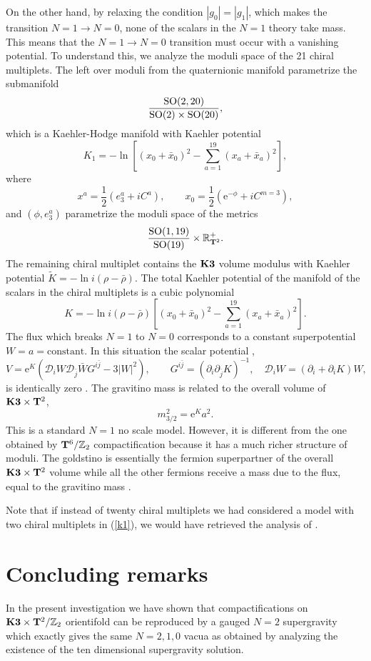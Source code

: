 \documentclass[a4paper,12pt]{article}
\begin{document}
On the other hand, by relaxing the condition $|g_0|=|g_1|$, which
makes the transition $N=1 \to N=0$, none of the scalars in the
$N=1$ theory take mass. This means that the $N=1 \to N=0$
transition must occur with a vanishing potential. To understand
this, we analyze the moduli space of the 21 chiral multiplets. The
left over moduli from the quaternionic manifold parametrize the
submanifold
$$\frac {\mathrm{SO}(2,20)}{\mathrm{SO}(2)\times \mathrm{SO}(20)},$$
which is a Kaehler-Hodge manifold with Kaehler potential
\begin{equation}K_1=-\ln[(x_0+\bar x_0)^2-\sum_{a=1}^{19}(x_a+\bar
x_a)^2],\label{k1}\end{equation} where
$$x^a=\frac 12(e^a_3+iC^a), \qquad x_0=\frac 12(\mathrm{e}^{-\phi}+iC^{m=3}),$$
and $(\phi, e^a_3)$ parametrize the moduli space of the metrics
$$\frac {\mathrm{SO}(1,19)}{\mathrm{SO}(19)}\times \mathbb{R}^+_{\mathbf{T}^2}.$$
The remaining chiral multiplet contains the $\mathbf{K3}$ volume modulus
with Kaehler potential $\tilde K= -\ln i(\rho-\bar \rho)$. The
total Kaehler potential of the manifold of the scalars in the
chiral multiplets is a cubic polynomial
$$K=-\ln i(\rho-\bar \rho)[(x_0+\bar x_0)^2-\sum_{a=1}^{19}(x_a+\bar
x_a)^2].$$ The flux which breaks $N=1$ to $N=0$ corresponds to a
constant superpotential $W=a=\mathrm{constant}$. In this situation
the scalar potential \cite{cfgp},
$$V=\mathrm{e}^K(\mathcal{D}_iW\mathcal{D}_{\bar j}\bar W G^{i\bar
j}-3|W|^2),\qquad  G^{i\bar j}=(\partial_i\partial_{\bar
j}K)^{-1},\quad \mathcal{D}_iW=(\partial_i+\partial_iK)W,$$ is
identically zero \cite{cfkn,ckpdfwg,bcf}. The gravitino mass is
related to the overall volume of $\mathbf{K3}\times \mathbf{T}^2$,
$$m^2_{3/2}=\mathrm{e}^K a^2.$$
This is a standard $N=1$ no scale model. However, it is different
from the one obtained by $\mathbf{T}^6/\mathbb{Z}_2$ compactification because it
has a much richer structure of moduli. The goldstino is
essentially the fermion superpartner of the overall $\mathbf{K3} \times
\mathbf{T}^2$ volume while all the other fermions receive a mass due to
the flux, equal to the gravitino mass \cite{cfkn}.

Note that if instead of twenty  chiral multiplets we had
considered a model with two chiral multiplets in (\ref{k1}), we
would have retrieved the analysis of \cite{fpo}.



\section{Concluding remarks}


In the present investigation we have shown that compactifications
on $\mathbf{K3} \times \mathbf{T}^2 / \mathbb{Z}_2$ orientifold can be reproduced by a
gauged $N=2$ supergravity which exactly gives the same $N=2,1,0$
vacua as obtained by analyzing the existence of the ten
dimensional supergravity solution.
\end{document}

